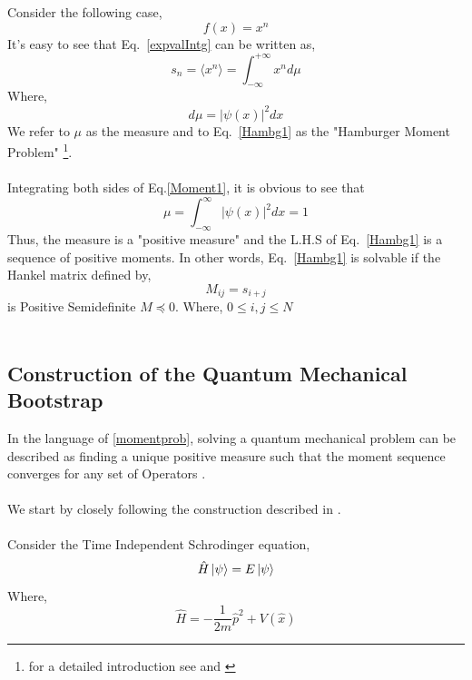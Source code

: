 \documentclass{article}
\theoremstyle{definition}
\begin{document}
Consider the following case,
\begin{equation}\label{casePolym}
    f(x) = x^{n}
\end{equation}
It's easy to see that Eq.~\eqref{expvalIntg} can be written as, 
    \begin{equation}\label{Hambg1}
  s_{n} = \langle {x^n} \rangle
    =\int_{-\infty}^{+\infty}  x^{n} d\mu
\end{equation}
Where, 
\begin{equation}\label{Moment1}
   d\mu = |\psi(x)|^{2} dx
\end{equation}
We refer to $\mu$ as the measure and to Eq.~\eqref{Hambg1} as the "Hamburger Moment Problem" \cite{Shohat1943ThePO}\footnote{for a detailed introduction see \cite{schmüdgen2017themomentproblem} and \cite{schmüdgen2020lecturesmomentproblem}}.\\
\\
Integrating both sides of Eq.\eqref{Moment1}, it is obvious to see that 
\begin{equation}\label{Moment2}
   \mu = \int_{-\infty}^{\infty} |\psi(x)|^{2} dx = 1
\end{equation}
Thus, the measure is a "positive measure" and the L.H.S of Eq.~\eqref{Hambg1} is a sequence of positive moments. In other words, Eq.~\eqref{Hambg1} is solvable if the Hankel matrix \cite{hamburg1} defined by, 
\begin{equation}\label{hankel}
    M_{ij} = s_{i+j} 
\end{equation}
is Positive Semidefinite $M \preceq 0$. Where, $0 \leq i,j \leq N$\\
\\

\subsection{Construction of the Quantum Mechanical Bootstrap}
In the language of \ref{momentprob}, solving a quantum mechanical problem can be described as finding a unique positive measure such that the moment sequence converges for any set of Operators \cite{nohutçu_2024}. \\
\\ 
We start by closely following the construction described in \cite{Berenstein:2021dyf}. \\
\\
Consider the Time Independent Schrodinger equation, 
\begin{equation}
     \hat{H} \ket{\psi} = E\ket{\psi} 
\end{equation}
Where,
\begin{equation*}
    \hat{H} =  -\frac{1}{2m} \hat{p}^{2} + V(\hat{x})  
\end{equation*}
\end{document}
